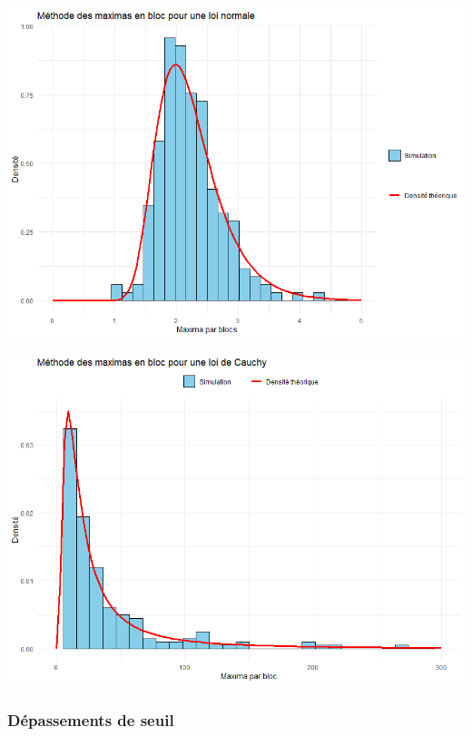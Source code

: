 \documentclass{article}
\theoremstyle{plain}
\theoremstyle{definition}
\theoremstyle{plain}
\begin{document}
\begin{center}
	\includegraphics[scale=0.60]{./images/MB_Normale} 
\end{center}

\begin{center}
	\includegraphics[scale=0.60]{./images/MB_Cauchy} 
\end{center}

\subsubsection{Dépassements de seuil}
\end{document}
